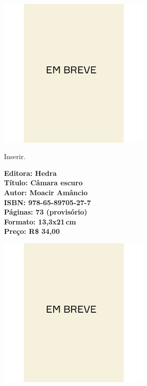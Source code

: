 \begin{center}
\hspace*{.5cm}\includegraphics[width=74mm]{./CAPAS/breve.jpeg}
\end{center}
\hspace*{-7cm}\hrulefill\hspace*{-7cm}
\medskip

\noindent{}Inserir.

\vfill
\noindent\begin{minipage}[c]{1\linewidth}
{\small\textbf{
\hspace*{-.1cm}Editora: Hedra\\
Título: Câmara escuro\\
Autor: Moacir Amâncio\\ 
ISBN: 978-65-89705-27-7\\
Páginas: 73 (provisório)\\
Formato: 13,3x21\,cm\\
Preço: R\$ 34,00\\
}}
\end{minipage}
\pagebreak

\begin{center}
\hspace*{.5cm}\includegraphics[width=74mm]{./CAPAS/breve.jpeg}
\end{center}
\hspace*{-7cm}\hrulefill\hspace*{-7cm}
\medskip

